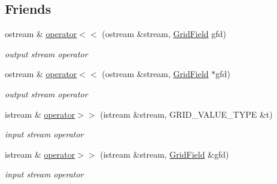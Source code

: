 \subsection*{Friends}
\begin{DoxyCompactItemize}
\item 
\hypertarget{classfwi_1_1grid_1_1GridField_a97aff68ce6ac7b18a2260b90af03ed4b}{ostream \& \hyperlink{classfwi_1_1grid_1_1GridField_a97aff68ce6ac7b18a2260b90af03ed4b}{operator$<$$<$} (ostream \&stream, \hyperlink{classfwi_1_1grid_1_1GridField}{Grid\-Field} gfd)}\label{classfwi_1_1grid_1_1GridField_a97aff68ce6ac7b18a2260b90af03ed4b}

\begin{DoxyCompactList}\small\item\em output stream operator \end{DoxyCompactList}\item 
\hypertarget{classfwi_1_1grid_1_1GridField_a11c7a73132cf9817dbb9194fd81d7a68}{ostream \& \hyperlink{classfwi_1_1grid_1_1GridField_a11c7a73132cf9817dbb9194fd81d7a68}{operator$<$$<$} (ostream \&stream, \hyperlink{classfwi_1_1grid_1_1GridField}{Grid\-Field} $\ast$gfd)}\label{classfwi_1_1grid_1_1GridField_a11c7a73132cf9817dbb9194fd81d7a68}

\begin{DoxyCompactList}\small\item\em output stream operator \end{DoxyCompactList}\item 
\hypertarget{classfwi_1_1grid_1_1GridField_a0ad898eced510b19238bee2528fba594}{istream \& \hyperlink{classfwi_1_1grid_1_1GridField_a0ad898eced510b19238bee2528fba594}{operator$>$$>$} (istream \&stream, G\-R\-I\-D\-\_\-\-V\-A\-L\-U\-E\-\_\-\-T\-Y\-P\-E \&t)}\label{classfwi_1_1grid_1_1GridField_a0ad898eced510b19238bee2528fba594}

\begin{DoxyCompactList}\small\item\em input stream operator \end{DoxyCompactList}\item 
\hypertarget{classfwi_1_1grid_1_1GridField_ac308d0fae2a770316681d5de6fdfb8a5}{istream \& \hyperlink{classfwi_1_1grid_1_1GridField_ac308d0fae2a770316681d5de6fdfb8a5}{operator$>$$>$} (istream \&stream, \hyperlink{classfwi_1_1grid_1_1GridField}{Grid\-Field} \&gfd)}\label{classfwi_1_1grid_1_1GridField_ac308d0fae2a770316681d5de6fdfb8a5}

\begin{DoxyCompactList}\small\item\em input stream operator \end{DoxyCompactList}\end{DoxyCompactItemize}


